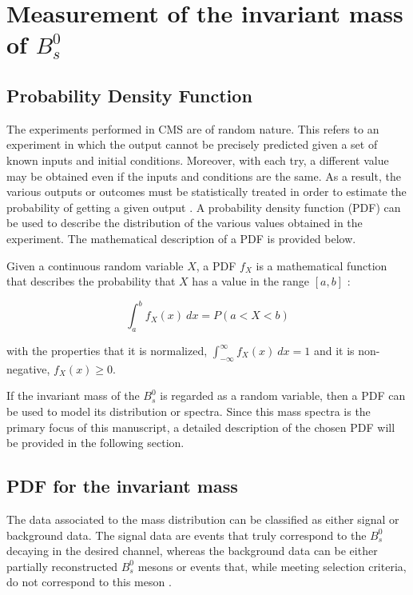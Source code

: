 \chapter[\leavevmode\newline Measurement of the invariant mass of $B^0_s$]{Measurement of the invariant mass of $B^0_s$}
\label{chap:Chapter_4}
\section{Probability Density Function}
The experiments performed in CMS are of random nature. This refers to an experiment in which the output cannot be precisely predicted given a set of known inputs and initial conditions. Moreover, with each try, a different value may be obtained even if the inputs and conditions are the same. As a result, the various outputs or outcomes must be statistically treated in order to estimate the probability of getting a given output \cite{vsirca2016probability}. A probability density function (PDF) can be used to describe the distribution of the various values obtained in the experiment. The mathematical description of a PDF is provided below.

Given a continuous random variable $X$, a PDF $f_X$ is a mathematical function that describes the probability that $X$ has a value in the range $[a, b]$ \cite{bragagnolo2021measurement, vsirca2016probability}:

\begin{equation}
	\int_{a}^{b} f_X(x) \ dx = P(a < X < b)
\end{equation}

with the properties that it is normalized, $\int_{-\infty}^{\infty} f_X(x) \ dx = 1$ and it is non-negative, $f_X(x) \geq 0$.

If the invariant mass of the $B^0_s$ is regarded as a random variable, then a PDF can be used to model its distribution or spectra. Since this mass spectra is the primary focus of this manuscript, a detailed description of the chosen PDF will be provided in the following section.
\section{PDF for the invariant mass}
The data associated to the mass distribution can be classified as either signal or background data. The signal data are events that truly correspond to the $B^0_s$ decaying in the desired channel, whereas the background data can be either partially reconstructed $B^0_s$ mesons or events that, while meeting selection criteria, do not correspond to this meson \cite{mejia2012medida}.

